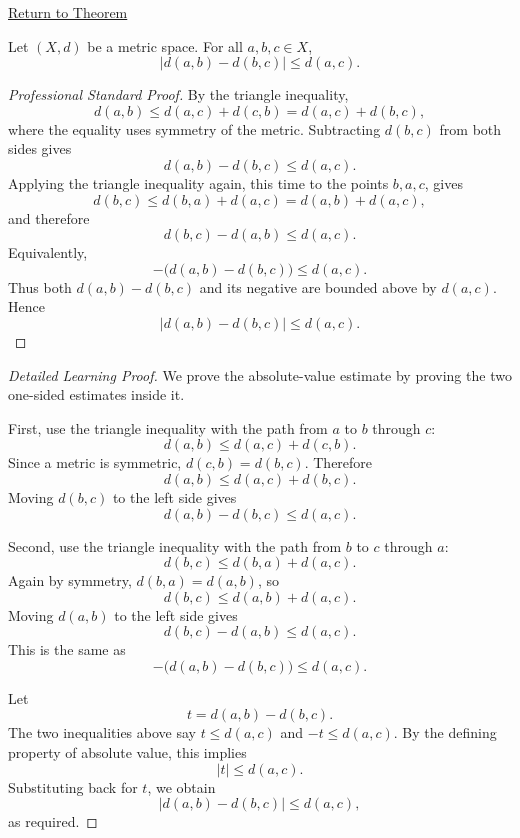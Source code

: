 \newpage
{}
\label{prf:metric-rearranged-triangle-inequality}

\begin{remark*}[Return]
\hyperref[thm:metric-rearranged-triangle-inequality]{Return to Theorem}
\end{remark*}

\begin{theorem*}
Let \((X,d)\) be a metric space.  For all \(a,b,c\in X\),
\[
  \bigl|d(a,b)-d(b,c)\bigr|
  \leq
  d(a,c).
\]
\end{theorem*}

\begin{proof}[Professional Standard Proof]
\LRAProofBodyStart
By the triangle inequality,
\[
  d(a,b)\leq d(a,c)+d(c,b)=d(a,c)+d(b,c),
\]
where the equality uses symmetry of the metric.  Subtracting \(d(b,c)\) from
both sides gives
\[
  d(a,b)-d(b,c)\leq d(a,c).
\]
Applying the triangle inequality again, this time to the points \(b,a,c\),
gives
\[
  d(b,c)\leq d(b,a)+d(a,c)=d(a,b)+d(a,c),
\]
and therefore
\[
  d(b,c)-d(a,b)\leq d(a,c).
\]
Equivalently,
\[
  -\bigl(d(a,b)-d(b,c)\bigr)\leq d(a,c).
\]
Thus both \(d(a,b)-d(b,c)\) and its negative are bounded above by \(d(a,c)\).
Hence
\[
  \bigl|d(a,b)-d(b,c)\bigr|\leq d(a,c).
\]
\end{proof}

\begin{proof}[Detailed Learning Proof]
\LRAProofBodyStart
We prove the absolute-value estimate by proving the two one-sided estimates
inside it.

First, use the triangle inequality with the path from \(a\) to \(b\) through
\(c\):
\[
  d(a,b)\leq d(a,c)+d(c,b).
\]
Since a metric is symmetric, \(d(c,b)=d(b,c)\).  Therefore
\[
  d(a,b)\leq d(a,c)+d(b,c).
\]
Moving \(d(b,c)\) to the left side gives
\[
  d(a,b)-d(b,c)\leq d(a,c).
\]

Second, use the triangle inequality with the path from \(b\) to \(c\) through
\(a\):
\[
  d(b,c)\leq d(b,a)+d(a,c).
\]
Again by symmetry, \(d(b,a)=d(a,b)\), so
\[
  d(b,c)\leq d(a,b)+d(a,c).
\]
Moving \(d(a,b)\) to the left side gives
\[
  d(b,c)-d(a,b)\leq d(a,c).
\]
This is the same as
\[
  -\bigl(d(a,b)-d(b,c)\bigr)\leq d(a,c).
\]

Let
\[
  t=d(a,b)-d(b,c).
\]
The two inequalities above say \(t\leq d(a,c)\) and \(-t\leq d(a,c)\).  By
the defining property of absolute value, this implies
\[
  |t|\leq d(a,c).
\]
Substituting back for \(t\), we obtain
\[
  \bigl|d(a,b)-d(b,c)\bigr|\leq d(a,c),
\]
as required.
\end{proof}

